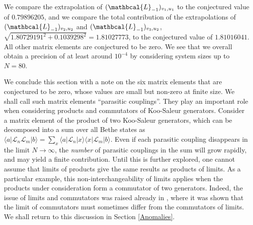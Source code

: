 \documentclass[a4paper,10pt]{article}
\newcommand{\linnea}[1]{$\framebox{\tiny L}$\ \textbf{\texttt{{\color{red}\footnotesize#1}}}}
\newcommand{\jesper}[1]{$\framebox{\tiny J}$\ \textbf{\texttt{{\color{cyan}\footnotesize#1}}}}
\newcommand{\LnMat}[1]{\mathbcal{L}_{#1}}
\begin{document}
%
We compare the extrapolation of $(\LnMat{-1})_{v_1,u_1}$ to the conjectured value of $0.79896205$, and we compare the total contribution of the extrapolations of $(\LnMat{-1})_{v_2,u_2} $ and $(\LnMat{-1})_{v_3,u_2}$,  $\sqrt{1.80729191^2+0.1039298^2}=1.81027773$, to the conjectured value of $1.81016041$. All other matrix elements are conjectured to be zero. We see that we overall obtain a precision of at least around $10^{-4}$ by considering system sizes up to $N=80$.





We conclude this section with a note on the six matrix elements that are conjectured to be zero, whose values are small but non-zero at finite size. We shall call such matrix elements ``parasitic couplings''. They play an important role when considering products and commutators of Koo-Saleur generators. Consider a matrix element of the product of two Koo-Saleur generators, which can be decomposed into a sum over all Bethe states as $\langle a | {\mathcal L}_n {\mathcal L}_m |b\rangle = \sum_x \langle a | {\mathcal L}_n | x \rangle \langle x | {\mathcal L}_m |b\rangle $. Even if each parasitic coupling disappears in the limit $N \rightarrow \infty$, the \emph{number} of parasitic couplings in the sum will grow rapidly, and may yield a finite contribution. Until this is further explored, one cannot assume that limits of products give the same results as products of limits. As a particular example, this non-interchangeability of limits applies when the products under consideration form a commutator of two generators. 
Indeed, the issue of limits and commutators was raised already in \cite{KooSaleur}, where it was shown that the limit of commutators must sometimes differ from the commutators of limits. We shall return to this discussion in Section \ref{Anomalies}. 
\end{document}
